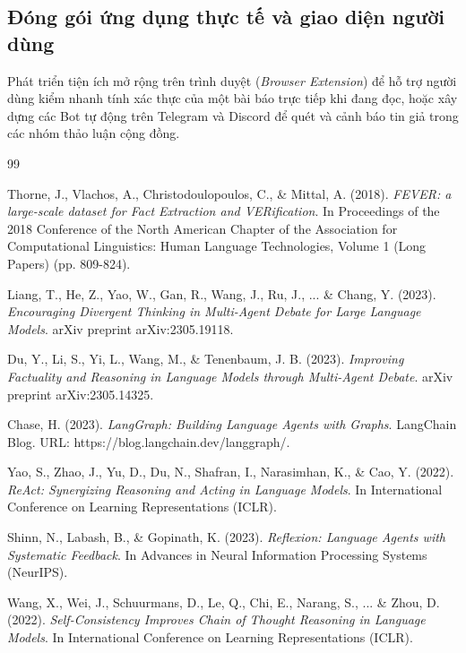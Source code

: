 \documentclass[12pt,a4paper]{report}
\begin{document}
\subsection{Đóng gói ứng dụng thực tế và giao diện người dùng}
Phát triển tiện ích mở rộng trên trình duyệt (\textit{Browser Extension}) để hỗ trợ người dùng kiểm nhanh tính xác thực của một bài báo trực tiếp khi đang đọc, hoặc xây dựng các Bot tự động trên Telegram và Discord để quét và cảnh báo tin giả trong các nhóm thảo luận cộng đồng.

\cleardoublepage
{}
{}

\begin{thebibliography}{99}

Thorne, J., Vlachos, A., Christodoulopoulos, C., \& Mittal, A. (2018).
\textit{FEVER: a large-scale dataset for Fact Extraction and VERification}.
In Proceedings of the 2018 Conference of the North American Chapter of the Association for Computational Linguistics: Human Language Technologies, Volume 1 (Long Papers) (pp. 809-824).

Liang, T., He, Z., Yao, W., Gan, R., Wang, J., Ru, J., ... \& Chang, Y. (2023).
\textit{Encouraging Divergent Thinking in Multi-Agent Debate for Large Language Models}.
arXiv preprint arXiv:2305.19118.

Du, Y., Li, S., Yi, L., Wang, M., \& Tenenbaum, J. B. (2023).
\textit{Improving Factuality and Reasoning in Language Models through Multi-Agent Debate}.
arXiv preprint arXiv:2305.14325.

Chase, H. (2023).
\textit{LangGraph: Building Language Agents with Graphs}.
LangChain Blog. URL: https://blog.langchain.dev/langgraph/.

Yao, S., Zhao, J., Yu, D., Du, N., Shafran, I., Narasimhan, K., \& Cao, Y. (2022).
\textit{ReAct: Synergizing Reasoning and Acting in Language Models}.
In International Conference on Learning Representations (ICLR).

Shinn, N., Labash, B., \& Gopinath, K. (2023).
\textit{Reflexion: Language Agents with Systematic Feedback}.
In Advances in Neural Information Processing Systems (NeurIPS).

Wang, X., Wei, J., Schuurmans, D., Le, Q., Chi, E., Narang, S., ... \& Zhou, D. (2022).
\textit{Self-Consistency Improves Chain of Thought Reasoning in Language Models}.
In International Conference on Learning Representations (ICLR).


\end{thebibliography}
\end{document}
